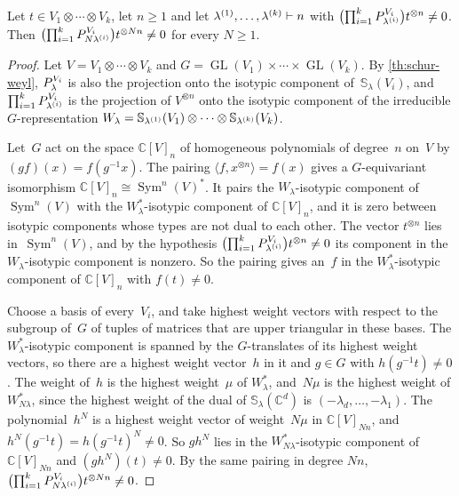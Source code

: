 \documentclass[11pt,letterpaper]{article}
\newcommand{\CC}{\mathbb{C}}
\DeclareMathOperator{\GL}{GL}
\DeclareMathOperator{\Sym}{Sym}
\begin{document}
\begin{lemma}\label{lem:scaling}
Let $t \in V_1 \otimes \cdots \otimes V_k$, let $n \geq 1$ and let $\lambda^{\smash{(1)}}, \ldots, \lambda^{\smash{(k)}} \vdash n$ with $\bigl(\prod_{i=1}^k P^{V_i}_{\lambda^{\smash{(i)}}}\bigr) t^{\otimes n} \neq 0$. Then $\bigl(\prod_{i=1}^{\smash[t]{k}} P^{\smash[t]{V_i}}_{N\lambda^{\smash{(i)}}}\bigr) t^{\otimes Nn} \neq 0$ for every $N \geq 1$.
\end{lemma}
\begin{proof}
Let $V = V_1 \otimes \cdots \otimes V_k$ and $G = \GL(V_1) \times \cdots \times \GL(V_k)$. By \cref{th:schur-weyl}, $P^{\smash[t]{V_i}}_{\lambda}$ is also the projection onto the isotypic component of~$\mathbb{S}_\lambda(V_i)$, and $\prod_{i=1}^{\smash[t]{k}} P^{\smash[t]{V_i}}_{\lambda^{\smash{(i)}}}$ is the projection of $V^{\otimes n}$ onto the isotypic component of the irreducible $G$-representation $W_\lambda = \mathbb{S}_{\lambda^{\smash{(1)}}}(V_1) \otimes \cdots \otimes \mathbb{S}_{\lambda^{\smash{(k)}}}(V_k)$.

Let~$G$ act on the space $\CC[V]_n$ of homogeneous polynomials of degree~$n$ on~$V$ by $(g f)(x) = f(g^{-1} x)$. The pairing $\langle f, x^{\otimes n} \rangle = f(x)$ gives a $G$-equivariant isomorphism $\CC[V]_n \cong \Sym^n(V)^*$. It pairs the $W_\lambda$-isotypic component of~$\Sym^n(V)$ with the $W_\lambda^*$-isotypic component of $\CC[V]_n$, and it is zero between isotypic components whose types are not dual to each other. The vector $t^{\otimes n}$ lies in~$\Sym^n(V)$, and by the hypothesis $\bigl(\prod_{i=1}^k P^{V_i}_{\lambda^{\smash{(i)}}}\bigr) t^{\otimes n} \neq 0$ its component in the $W_\lambda$-isotypic component is nonzero. So the pairing gives an~$f$ in the $W_\lambda^*$-isotypic component of $\CC[V]_n$ with $f(t) \neq 0$.

Choose a basis of every~$V_i$, and take highest weight vectors with respect to the subgroup of~$G$ of tuples of matrices that are upper triangular in these bases. The $W_\lambda^*$-isotypic component is spanned by the $G$-translates of its highest weight vectors, so there are a highest weight vector~$h$ in it and $g \in G$ with $h(g^{-1} t) \neq 0$. The weight of~$h$ is the highest weight~$\mu$ of $W_\lambda^*$, and~$N\mu$ is the highest weight of $W_{N\lambda}^*$, since the highest weight of the dual of $\mathbb{S}_\lambda(\CC^d)$ is $(-\lambda_d, \ldots, -\lambda_1)$. The polynomial~$h^N$ is a highest weight vector of weight~$N\mu$ in $\CC[V]_{Nn}$, and $h^N(g^{-1} t) = h(g^{-1} t)^N \neq 0$. So $g h^N$ lies in the $W_{N\lambda}^*$-isotypic component of $\CC[V]_{Nn}$ and $(g h^N)(t) \neq 0$. By the same pairing in degree $Nn$, $\bigl(\prod_{i=1}^k P^{V_i}_{N\lambda^{\smash{(i)}}}\bigr) t^{\otimes Nn} \neq 0$.
\end{proof}
\end{document}
